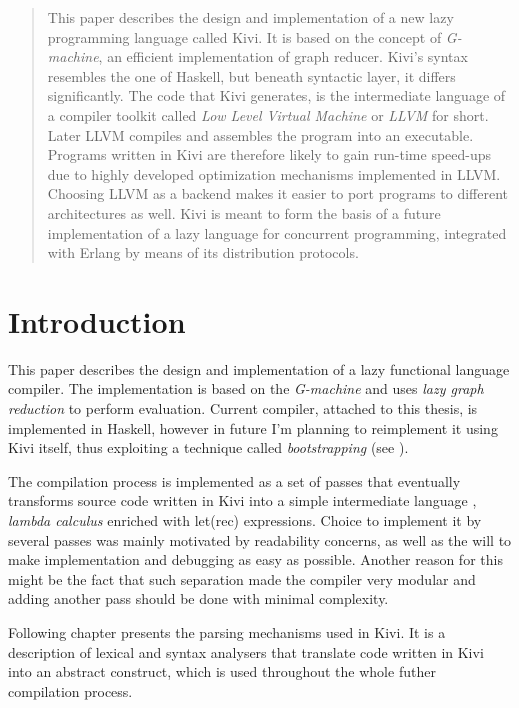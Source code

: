 \documentclass[12pt,a4paper]{report}
\begin{document}
\Huge
\begin{abstract}
  \normalsize
  \center
  This paper describes the design and implementation of a new lazy programming
  language called Kivi. It is based on the concept of \textit{G-machine}, an
  efficient implementation of graph reducer. Kivi's syntax resembles the one of
  Haskell, but beneath syntactic layer, it differs significantly. The code that
  Kivi generates, is the intermediate language of a compiler toolkit called
  \textit{Low Level Virtual Machine}\cite{website:llvm} or \textit{LLVM} for
  short.  Later LLVM compiles and assembles the program into an executable.
  Programs written in Kivi are therefore likely to gain run-time speed-ups due
  to highly developed optimization mechanisms implemented in LLVM. Choosing
  LLVM as a backend makes it easier to port programs to different architectures
  as well.  Kivi is meant to form the basis of a future implementation of a
  lazy language for concurrent programming, integrated with Erlang by means of
  its distribution protocols.
\end{abstract}

\normalsize

\tableofcontents

\chapter{Introduction}

This paper describes the design and implementation of a lazy functional
language compiler. The implementation is based on the
\textit{G-machine}\cite{Jon87} and uses \textit{lazy graph reduction} to
perform evaluation. Current compiler, attached to this thesis, is implemented
in Haskell, however in future I'm planning to reimplement it using Kivi itself,
thus exploiting a technique called \textit{bootstrapping} (see
\cite{wiki:bootstrapping}).

The compilation process is implemented as a set of passes that eventually
transforms source code written in Kivi into a simple intermediate language
, \textit{lambda calculus} enriched with let(rec) expressions. Choice to
implement it by several passes was mainly motivated by readability concerns, as
well as the will to make implementation and debugging as easy as possible.
Another reason for this might be the fact that such separation made the
compiler very modular and adding another pass should be done with minimal
complexity.

Following chapter presents the parsing mechanisms used in Kivi. It is a description
of lexical and syntax analysers that translate code written in Kivi into an
abstract construct, which is used throughout the whole futher compilation
process.
\end{document}
